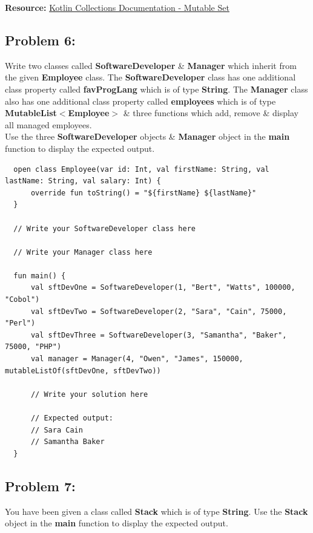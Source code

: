 \documentclass{article}
\begin{document}
\textbf{Resource:} \href{https://kotlinlang.org/api/latest/jvm/stdlib/kotlin.collections/-mutable-set/}{Kotlin Collections Documentation - Mutable Set}

\subsection*{Problem 6:} 
Write two classes called \textbf{SoftwareDeveloper} \& \textbf{Manager} which inherit from the given \textbf{Employee} class. The \textbf{SoftwareDeveloper} class has one additional class property called \textbf{favProgLang} which is of type \textbf{String}. The \textbf{Manager} class also has one additional class property called \textbf{employees} which is of type \textbf{MutableList$<$Employee$>$} \& three functions which add, remove \& display all managed employees. \\

Use the three \textbf{SoftwareDeveloper} objects \& \textbf{Manager} object in the \textbf{main} function to display the expected output.

\begin{verbatim}
  open class Employee(var id: Int, val firstName: String, val lastName: String, val salary: Int) {
      override fun toString() = "${firstName} ${lastName}"
  }

  // Write your SoftwareDeveloper class here

  // Write your Manager class here

  fun main() {
      val sftDevOne = SoftwareDeveloper(1, "Bert", "Watts", 100000, "Cobol")
      val sftDevTwo = SoftwareDeveloper(2, "Sara", "Cain", 75000, "Perl")
      val sftDevThree = SoftwareDeveloper(3, "Samantha", "Baker", 75000, "PHP")
      val manager = Manager(4, "Owen", "James", 150000, mutableListOf(sftDevOne, sftDevTwo))

      // Write your solution here

      // Expected output:
      // Sara Cain
      // Samantha Baker
  }
\end{verbatim}

\subsection*{Problem 7:}
You have been given a class called \textbf{Stack} which is of type \textbf{String}. Use the \textbf{Stack} object in the \textbf{main} function to display the expected output.
\end{document}
